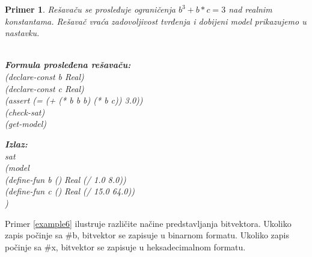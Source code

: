 \documentclass[12pt,oneside]{memoir}
\newcommand\tab[1][0.5cm]{\hspace*{#1}}
\newtheorem{primer}{Primer}
\begin{document}
\begin{primer}
\label{example5} Rešavaču se prosleđuje ograničenja $b^{3} + b*c = 3$ nad realnim konstantama. Rešavač vraća zadovoljivost tvrđenja i dobijeni model prikazujemo u nastavku.   
\\ \\
\begin{minipage}[b]{0.43\textwidth}
\textbf{Formula prosleđena rešavaču:}
\\(declare-const b Real)
\\(declare-const c Real)
\\(assert (= (+ (* b b b) (* b c)) 3.0))
\\(check-sat)
\\(get-model)

\end{minipage}
\hspace{1.5cm}
\begin{minipage}[t]{0.45\textwidth}
\vspace{-3.4cm}
\textbf{Izlaz:}
\\sat 
\\(model 
\\\tab(define-fun b () Real (/ 1.0 8.0)) 
\\\tab(define-fun c () Real (/ 15.0 64.0))
\\)
\end{minipage}
\end{primer}
\par
Primer \ref{example6} ilustruje različite načine predstavljanja bitvektora. Ukoliko zapis počinje sa \#b, bitvektor se zapisuje u binarnom formatu. Ukoliko zapis počinje sa \#x, bitvektor se zapisuje u heksadecimalnom formatu.
\end{document}
